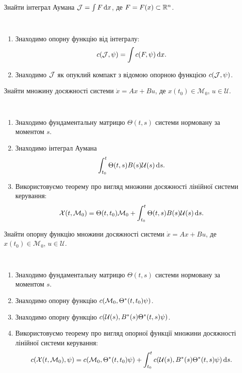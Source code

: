 \begin{problem*}
	Знайти інтеграл Аумана $\mathcal{J} = \int F \mathop{}\!\mathrm{d} x$, де $F = F(x)\subset\mathbb{R}^n$.
\end{problem*}

\begin{algorithm} \tt
	\begin{enumerate}
		\item Знаходимо опорну функцію від інтегралу: \[ c(\mathcal{J}, \psi) = \int c (F, \psi) \mathop{}\!\mathrm{d} x.\]
		\item Знаходимо $\mathcal{J}$ як опуклий компакт з відомою опорною функцією $c(\mathcal{J}, \psi)$.
	\end{enumerate}
\end{algorithm}

\begin{problem*}
	Знайти множину досяжності системи $\dot x = A x + B u$, де $x(t_0) \in \mathcal{M}_0$, $u \in \mathcal{U}$.
\end{problem*}

\begin{algorithm} \tt
	\begin{enumerate}
		\item Знаходимо фундаментальну матрицю $\Theta(t,s)$ системи нор\-мо\-ва\-ну за моментом $s$.
		\item Знаходимо інтеграл Аумана \[\int_{t_0}^t \Theta(t, s) B(s) \mathcal{U}(s) \mathop{}\!\mathrm{d} s.\]
		\item Використовуємо теорему про вигляд множини досяжності лінійної сис\-те\-ми керування: \[ \mathcal{X}(t, \mathcal{M}_0) = \Theta(t, t_0) \mathcal{M}_0 + \int_{t_0}^t \Theta(t, s) B(s) \mathcal{U}(s) \mathop{}\!\mathrm{d} s. \]
	\end{enumerate}
\end{algorithm}

\begin{problem*}
	Знайти опорну функцію множини досяжності системи $\dot x = A x + B u$, де $x(t_0) \in \mathcal{M}_0$, $u \in \mathcal{U}$.
\end{problem*}

\begin{algorithm} \tt
	\begin{enumerate}
		\item Знаходимо фундаментальну матрицю $\Theta(t,s)$ системи нор\-мо\-ва\-ну за моментом $s$.
		\item Знаходимо опорну функцію $c(\mathcal{M}_0, \Theta^*(t, t_0) \psi)$.
		\item Знаходимо опорну функцію $c(\mathcal{U}(s), B^*(s) \Theta^*(t, s) \psi)$.
		\item Використовуємо теорему про вигляд опорної функції множини до\-сяж\-но\-с\-ті лінійної системи керування: \[ c(\mathcal{X}(t, \mathcal{M}_0), \psi) = c(\mathcal{M}_0, \Theta^*(t, t_0) \psi) + \int_{t_0}^t c(\mathcal{U}(s), B^*(s) \Theta^*(t, s) \psi) \mathop{}\!\mathrm{d} s. \]
	\end{enumerate}
\end{algorithm}

